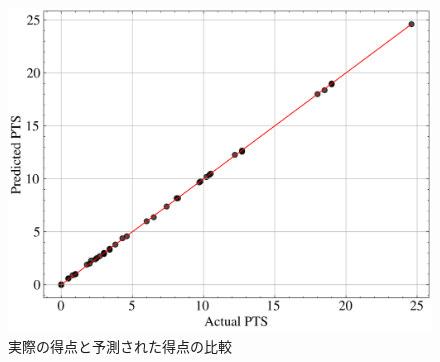 \begin{figure}
	\centering
	\includegraphics[width=0.8\linewidth]{src/figures/nba-regression/actual-vs-predicted-PTS.png}
	\caption{実際の得点と予測された得点の比較}\label{fig:actual-vs-predicted-PTS}
\end{figure}
